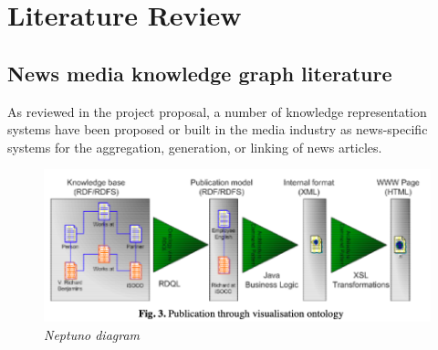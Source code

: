 \documentclass[11pt]{article}
\begin{document}




\section{Literature Review}

\label{sec:LiteratureReview}

\subsection{News media knowledge graph literature}

As reviewed in the project proposal\cite{ek-proposal}, a number of knowledge representation systems have been proposed or built in the media industry as news-specific systems for the aggregation, generation, or linking of news articles. 

\begin{figure}
  \centerline{\includegraphics[scale=0.4]{literature-review--neptuno.png}}
  \caption{\textit{Neptuno diagram}}
\end{figure}
\end{document}
